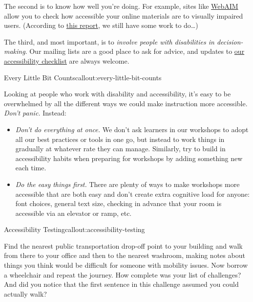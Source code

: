 The second is to know how well you're doing. For example, sites like
\href{http://webaim.org/}{WebAIM} allow you to check how accessible your
online materials are to visually impaired users. (According to
\href{http://wave.webaim.org/report\#/software-carpentry.org}{this
report}, we still have some work to do\ldots{})

The third, and most important, is to \emph{involve people with
disabilities in decision-making}. Our mailing lists are a good place to
ask for advice, and updates to
\href{http://software-carpentry.org/workshops/checklists/accessibility/}{our
accessibility checklist} are always welcome.

\begin{callout}{Every Little Bit Counts}{callout:every-little-bit-counts}

Looking at people who work with disability and accessibility, it's easy
to be overwhelmed by all the different ways we could make instruction
more accessible. \emph{Don't panic.} Instead:

\begin{itemize}
\item
  \emph{Don't do everything at once.} We don't ask learners in our
  workshops to adopt all our best practices or tools in one go, but
  instead to work things in gradually at whatever rate they can manage.
  Similarly, try to build in accessibility habits when preparing for
  workshops by adding something new each time.
\item
  \emph{Do the easy things first.} There are plenty of ways to make
  workshops more accessible that are both easy and don't create extra
  cognitive load for anyone: font choices, general text size, checking
  in advance that your room is accessible via an elevator or ramp, etc.
\end{itemize}
\end{callout}

\begin{callout}{Accessibility Testing}{callout:accessibility-testing}

Find the nearest public transportation drop-off point to your building
and walk from there to your office and then to the nearest washroom,
making notes about things you think would be difficult for someone with
mobility issues. Now borrow a wheelchair and repeat the journey. How
complete was your list of challenges? And did you notice that the first
sentence in this challenge assumed you could actually walk?
\end{callout}

